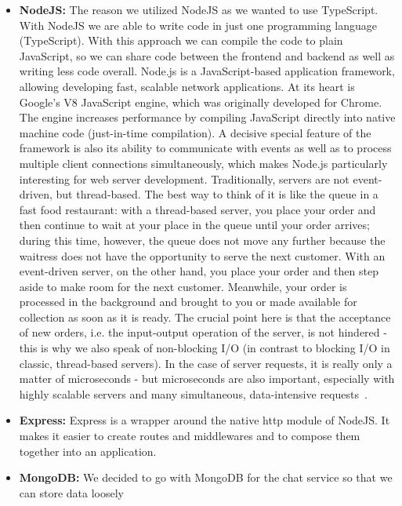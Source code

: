 \begin{itemize}
    \item \textbf{NodeJS:} The reason we utilized NodeJS as we wanted to use TypeScript.
        With NodeJS we are able to write code in just one programming language (TypeScript).
        With this approach we can compile the code to plain JavaScript, so we can share code between the frontend and
        backend as well as writing less code overall.
        Node.js is a JavaScript-based application framework, allowing developing fast, scalable network applications.
        At its heart is Google's V8 JavaScript engine, which was originally developed for Chrome.
        The engine increases performance by compiling JavaScript directly into native machine code
        (just-in-time compilation).
        A decisive special feature of the framework is also its ability to communicate with events as well as to
        process multiple client connections simultaneously, which makes Node.js particularly interesting for web server
        development.
        Traditionally, servers are not event-driven, but thread-based.
        The best way to think of it is like the queue in a fast food restaurant: with a thread-based server, you place
        your order and then continue to wait at your place in the queue until your order arrives; during this time,
        however, the queue does not move any further because the waitress does not have the opportunity to serve the
        next customer.
        With an event-driven server, on the other hand, you place your order and then step aside to make room for the
        next customer.
        Meanwhile, your order is processed in the background and brought to you or made available for collection as
        soon as it is ready.
        The crucial point here is that the acceptance of new orders, i.e. the input-output operation of the server,
        is not hindered - this is why we also speak of non-blocking I/O (in contrast to blocking I/O in classic,
        thread-based servers).
        In the case of server requests, it is really only a matter of microseconds - but microseconds are also
        important, especially with highly scalable servers and many simultaneous, data-intensive requests~\cite{nodejs}.
    \item \textbf{Express:} Express is a wrapper around the native \ac{http} module of NodeJS.
        It makes it easier to create routes and middlewares and to compose them together into an application.
    \item \textbf{MongoDB:} We decided to go with MongoDB for the chat service so that we can store data loosely

\end{itemize}
